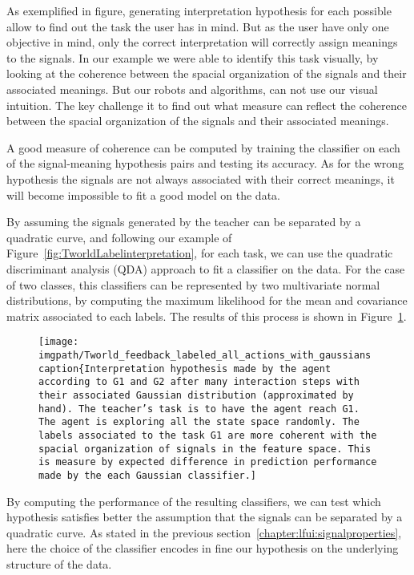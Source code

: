As exemplified in figure, generating interpretation hypothesis for each possible allow to find out the task the user has in mind. But as the user have only one objective in mind, only the correct interpretation will correctly assign meanings to the signals. In our example we were able to identify this task visually, by looking at the coherence between the spacial organization of the signals and their associated meanings. But our robots and algorithms, can not use our visual intuition. The key challenge it to find out what measure can reflect the coherence between the spacial organization of the signals and their associated meanings.

A good measure of coherence can be computed by training the classifier on each of the signal-meaning hypothesis pairs and testing its accuracy. As for the wrong hypothesis the signals are not always associated with their correct meanings, it will become impossible to fit a good model on the data. 

By assuming the signals generated by the teacher can be separated by a quadratic curve, and following our example of Figure~\ref{fig:TworldLabelinterpretation}, for each task, we can use the  quadratic discriminant analysis (QDA) \cite{lachenbruch1975discriminant} approach to fit a classifier on the data. For the case of two classes, this classifiers can be represented by two multivariate normal distributions, by  computing the maximum likelihood for the mean and covariance matrix associated to each labels. The results of this process is shown in Figure~\ref{fig:TworldLabelGaussian}.

\begin{figure}[!ht]
    \centering
    \texttt{[image: \\imgpath/Tworld\_feedback\_labeled\_all\_actions\_with\_gaussians
    \\caption\{Interpretation hypothesis made by the agent according to G1 and G2 after many interaction steps with their associated Gaussian distribution (approximated by hand). The teacher's task is to have the agent reach G1. The agent is exploring all the state space randomly. The labels associated to the task G1 are more coherent with the spacial organization of signals in the feature space. This is measure by expected difference in prediction performance made by the each Gaussian classifier.]}
    \label{fig:TworldLabelGaussian}
\end{figure}

By computing the performance of the resulting classifiers, we can test which hypothesis satisfies better the assumption that the signals can be separated by a quadratic curve. As stated in the previous section~\ref{chapter:lfui:signalproperties}, here the choice of the classifier encodes in fine our hypothesis on the underlying structure of the data.

